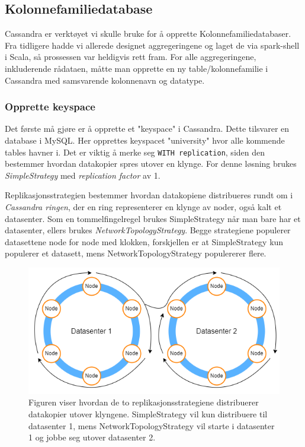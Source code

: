 \subsection{Kolonnefamiliedatabase}
Cassandra er verktøyet vi skulle bruke for å opprette Kolonnefamiliedatabaser. Fra tidligere hadde vi allerede designet aggregeringene og laget de via spark-shell i Scala, så prossessen var heldigvis rett fram. For alle aggregeringene, inkluderende rådataen, måtte man opprette en ny table/kolonnefamilie i Cassandra med samsvarende kolonnenavn og datatype.

\subsubsection{Opprette keyspace}
Det første må gjøre er å opprette et "keyspace" i Cassandra. Dette tilsvarer en database i MySQL. Her opprettes keyspacet "university" hvor alle kommende tables havner i. Det er viktig å merke seg \lstinline{WITH replication}, siden den bestemmer hvordan datakopier spres utover en klynge. For denne løsning brukes \textit{SimpleStrategy} med \textit{replication factor} av 1. 


Replikasjonsstrategien bestemmer hvordan datakopiene distribueres rundt om i \textit{Cassandra ringen}, der en ring representerer en klynge av noder, også kalt et datasenter. Som en tommelfingelregel brukes SimpleStrategy når man bare har et datasenter, ellers brukes \textit{NetworkTopologyStrategy}. Begge strategiene populerer datasettene node for node med klokken, forskjellen er at SimpleStrategy kun populerer et datasett, mens NetworkTopologyStrategy populererer flere.

\begin{figure}[H]
  \centering
  \includegraphics[scale=0.5]{images/replicationstrategy.drawio.png}
  \caption{Figuren viser hvordan de to replikasjonsstrategiene distribuerer datakopier utover klyngene. SimpleStrategy vil kun distribuere til datasenter 1, mens NetworkTopologyStrategy vil starte i datasenter 1 og jobbe seg utover datasenter 2.}
\end{figure}

